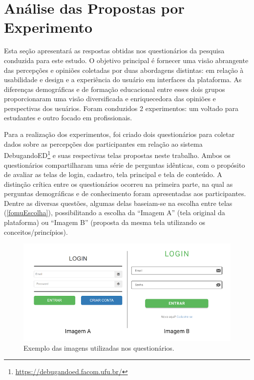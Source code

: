
\section{Análise das Propostas por Experimento}

Esta seção apresentará as respostas obtidas nos questionários da pesquisa conduzida para este estudo. O objetivo principal é fornecer uma visão abrangente das percepções e opiniões coletadas por duas abordagens distintas: em relação à usabilidade e design e a experiência do usuário em interfaces da plataforma. As diferenças demográficas e de formação educacional entre esses dois grupos proporcionaram uma visão diversificada e enriquecedora das opiniões e perspectivas dos usuários. Foram conduzidos 2 experimentos: um voltado para estudantes e outro focado em profissionais. 

Para a realização dos experimentos, foi criado dois questionários para coletar dados sobre as percepções dos participantes em relação ao sistema DebugandoED\footnote{\url{https://debugandoed.facom.ufu.br/}} e suas respectivas telas propostas neste trabalho. Ambos os questionários compartilharam uma série de perguntas idênticas, com o propósito de avaliar as telas de login, cadastro, tela principal e tela de conteúdo. A distinção crítica entre os questionários ocorreu na primeira parte, na qual as perguntas demográficas e de conhecimento foram apresentadas aos participantes. Dentre as diversas questões, algumas delas baseiam-se na escolha entre telas (\autoref{fomuEscolha}), possibilitando a escolha da ``Imagem A'' (tela original da plataforma) ou ``Imagem B'' (proposta da mesma tela utilizando os conceitos/princípios).

\begin{figure}[ht]
    \begin{center}
	    \includegraphics[scale=0.4]{figs/form_compara.png}
	\end{center}
    \caption{\label{fomuEscolha}Exemplo das imagens utilizadas nos questionários.}
\end{figure}

